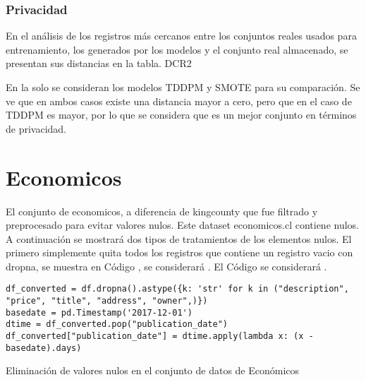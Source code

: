

\newpage
\subsubsection{Privacidad}
En el análisis de los registros más cercanos entre los conjuntos reales usados para entrenamiento, los generados por los modelos y el conjunto real almacenado, se presentan sus distancias en la tabla.
DCR2



En la  solo se consideran los modelos TDDPM y SMOTE para su comparación. Se ve que en ambos casos existe una distancia mayor a cero, pero que en el caso de TDDPM es mayor, por lo que se considera que es un mejor conjunto en términos de privacidad.




\newpage
\section{Economicos}
El conjunto de economicos, a diferencia de kingcounty que fue filtrado y preprocesado para evitar valores nulos. Este dataset economicos.cl contiene nulos. A continuación se mostrará dos tipos de tratamientos de los elementos nulos. El primero simplemente quita todos los registros que contiene un registro vacio con dropna, se muestra en Código , se considerará . El Código  se considerará .


\begin{listing}[H]
    \begin{verbatim}
df_converted = df.dropna().astype({k: 'str' for k in ("description", "price", "title", "address", "owner",)})
basedate = pd.Timestamp('2017-12-01')
dtime = df_converted.pop("publication_date")
df_converted["publication_date"] = dtime.apply(lambda x: (x - basedate).days)
    \end{verbatim}
\caption{Eliminación de valores nulos en el conjunto de datos de Económicos}
\label{codigo-remove-nan}
\end{listing}

